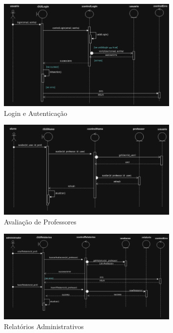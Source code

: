 \documentclass[12pt]{article}
\begin{document}
\begin{figure}[H]
    \centering
    \includegraphics[width=0.8\textwidth]{diagramas/i2-login-autent.png}
    \caption{Login e Autenticação}
    \label{fig:i2-login-autent}
\end{figure}

\begin{figure}[H]
    \centering
    \includegraphics[width=0.8\textwidth]{diagramas/i3-avaliac-professores.png}
    \caption{Avaliação de Professores}
    \label{fig:i3-avaliac-professores}
\end{figure}

\begin{figure}[H]
    \centering
    \includegraphics[width=0.8\textwidth]{diagramas/i5-relatorios-admin.png}
    \caption{Relatórios Administrativos}
    \label{fig:i5-relatorios-admin}
\end{figure}
\end{document}
